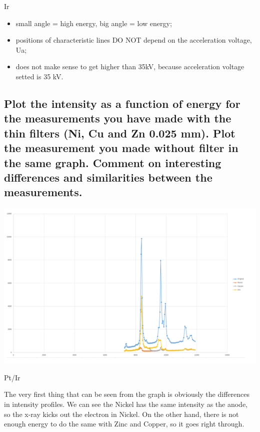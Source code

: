 Ir\documentclass{article}
\begin{document}
\begin{itemize}
  \item small angle = high energy,  big angle = low energy;
  \item positions of characteristic lines DO NOT depend on the acceleration voltage, Ua;
  \item does not make sense to get higher than 35kV, because acceleration voltage setted is 35 kV.
\end{itemize}

\subsection{Plot the intensity as a function of energy for the measurements you have
made with the thin filters (Ni, Cu and Zn 0.025 mm). Plot the measurement
you made without filter in the same graph. Comment on interesting
differences and similarities between the measurements.}



\begin{center}
\includegraphics[width=\textwidth,height=\textheight,keepaspectratio]{pictures/3b.png}
\caption{Pt/Ir}
\end{center}

The very first thing that can be seen from the graph is obviously the differences in intensity profiles. We can see the Nickel has the same intensity as the anode, so the x-ray kicks out the electron in Nickel. On the other hand, there is not enough energy to do the same with Zinc and Copper, so it goes right through.
\end{document}

